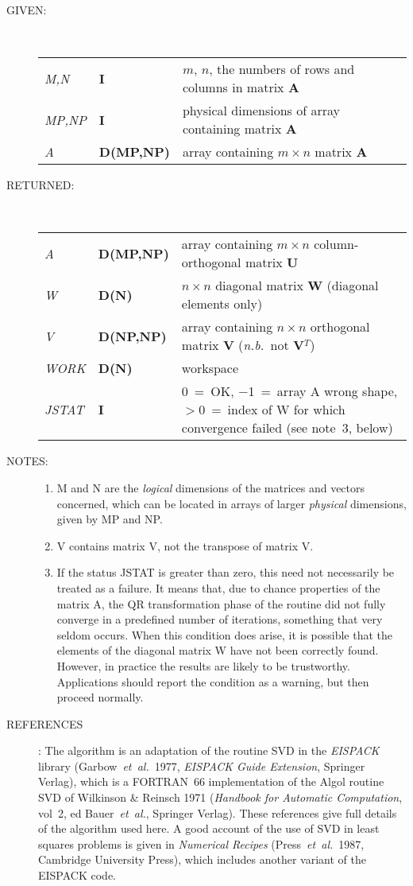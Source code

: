 \documentclass[11pt,twoside]{article}
\newlength{\oldspacing}
\newcommand{\args}[2]
{
  \goodbreak
  \setlength{\oldspacing}{\topsep}
  \setlength{\topsep}{0.3ex}
  \begin{description}
  \item[#1]:\\[1.5ex]
    \begin{tabular}{p{7em}p{6em}p{22em}}
      #2
    \end{tabular}
  \end{description}
  \setlength{\topsep}{\oldspacing}
}
\renewcommand{\args}[2]
   {
     \begin{description}
        \item[#1:]\\
        \begin{tabular}{p{7em}p{6em}l}
           #2
        \end{tabular}
     \end{description}
   }
\newcommand{\spec}[3]
{
  {\em {#1}} & {\bf \mbox{#2}} & {#3}
}
\newcommand{\notes}[1]
{
  \goodbreak
  \setlength{\oldspacing}{\topsep}
  \setlength{\topsep}{0.3ex}
  \begin{description}
    \item[NOTES]:
        #1
  \end{description}
  \setlength{\topsep}{\oldspacing}
}
\renewcommand{\notes}[1]
   {
      \begin{description}
         \item[NOTES:]
            #1
      \end{description}
   }
\newcommand{\refs}[1]
{
  \goodbreak
  \setlength{\oldspacing}{\topsep}
  \setlength{\topsep}{0.3ex}
  \begin{description}
    \item[REFERENCES]:
        #1
  \end{description}
  \setlength{\topsep}{\oldspacing}
}
\newcommand{\refs}[1]
   {
     \begin{description}
       \item[REFERENCES:]
           #1
     \end{description}
   }
\begin{document}
\args{GIVEN}
{
 \spec{M,N}{I}{$m$, $n$, the numbers of rows and columns in matrix {\bf A}} \\
 \spec{MP,NP}{I}{physical dimensions of array containing matrix {\bf A}} \\
 \spec{A}{D(MP,NP)}{array containing $m \times n$ matrix {\bf A}}
}
\args{RETURNED}
{
 \spec{A}{D(MP,NP)}{array containing $m \times n$ column-orthogonal
                    matrix {\bf U}} \\
 \spec{W}{D(N)}{$n \times n$ diagonal matrix {\bf W}
               (diagonal elements only)} \\
 \spec{V}{D(NP,NP)}{array containing $n \times n$ orthogonal
                    matrix {\bf V} ({\it n.b.}\ not {\bf V}$^{T}$)} \\
 \spec{WORK}{D(N)}{workspace} \\
 \spec{JSTAT}{I}{0~=~OK, $-$1~=~array A wrong shape, $>$0~=~index of W
                 for which convergence failed (see note~3, below)}
}
\notes
{
 \begin{enumerate}
  \item M and N are the {\it logical}\/ dimensions of the
        matrices and vectors concerned, which can be located in
        arrays of larger {\it physical}\/ dimensions, given by MP and NP.
  \item V contains matrix V, not the transpose of matrix V.
  \item If the status JSTAT is greater than zero, this need not
        necessarily be treated as a failure.  It means that, due to
        chance properties of the matrix A, the QR transformation
        phase of the routine did not fully converge in a predefined
        number of iterations, something that very seldom occurs.
        When this condition does arise, it is possible that the
        elements of the diagonal matrix W have not been correctly
        found.  However, in practice the results are likely to
        be trustworthy.  Applications should report the condition
        as a warning, but then proceed normally.
 \end{enumerate}
}
\refs{The algorithm is an adaptation of the routine SVD in the {\it EISPACK}\,
      library (Garbow~{\it et~al.}\ 1977, {\it EISPACK Guide Extension},
      Springer Verlag), which is a FORTRAN~66 implementation of the Algol
      routine SVD of Wilkinson \& Reinsch 1971 ({\it Handbook for Automatic
      Computation}, vol~2, ed Bauer~{\it et~al.}, Springer Verlag).  These
      references give full details of the algorithm used here.
      A good account of the use of SVD in least squares problems is given
      in {\it Numerical Recipes}\/ (Press~{\it et~al.}\ 1987, Cambridge
      University Press), which includes another variant of the EISPACK code.}
\end{document}
